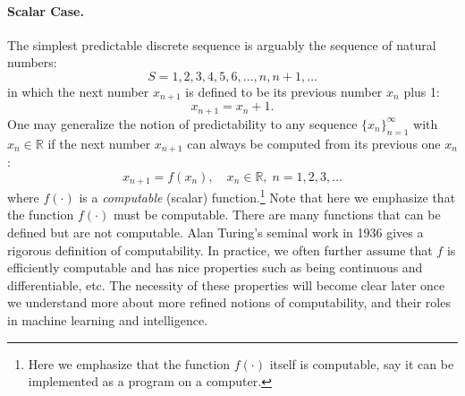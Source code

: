 \documentclass[../../book-main.tex]{subfiles}
\begin{document}
\paragraph{Scalar Case.} The simplest predictable discrete sequence is arguably the sequence of natural numbers:
\begin{equation}
   {S} =  1, 2, 3, 4, 5, 6, \ldots, n, n+1, \ldots
\end{equation}
in which the next number $x_{n+1}$ is defined to be its previous number $x_n$ plus 1:
\begin{equation}
x_{n+1} = x_n + 1.    
\end{equation}
One may generalize the notion of predictability to any sequence $\{x_n\}_{n=1}^\infty$ with $ x_n \in \mathbb{R}$ if the next number $x_{n+1}$ can always be computed from its previous one $x_n$:
\begin{equation}
    x_{n+1} = f(x_{n}), \quad x_n \in \mathbb{R}, \; n =  1, 2, 3, \ldots
\end{equation}
where $f(\cdot)$ is a {\em computable} (scalar) function.\footnote{Here we emphasize that the function $f(\cdot)$ itself is computable, say it can be implemented as a program on a computer. } Note that here we emphasize that the function $f(\cdot)$ must be computable. There are many functions that can be defined but are not computable. Alan Turing's seminal work in 1936 \cite{Turing-1936} gives a rigorous definition of computability. In practice, we often further assume that $f$ is efficiently computable and has nice properties such as being continuous and differentiable, etc. The necessity of these properties will become clear later once we understand more about more refined notions of computability, and their roles in machine learning and intelligence.
\end{document}
